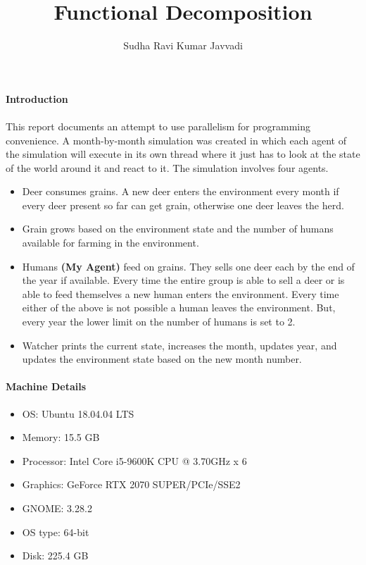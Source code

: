\documentclass[notitlepage]{report}
\title{Functional Decomposition}
\author{Sudha Ravi Kumar Javvadi}
\begin{document}
	\maketitle
	\paragraph{Introduction}
	\paragraph{} This report documents an attempt to use parallelism for programming convenience. A month-by-month simulation was created in which each agent of the simulation will execute in its own thread where it just has to look at the state of the world around it and react to it. The simulation involves four agents.
	\begin{itemize}
		\item{Deer} consumes grains. A new deer enters the environment every month if every deer present so far can get grain, otherwise one deer leaves the herd.
		\item{Grain} grows based on the environment state and the number of humans available for farming in the environment.
		\item{Humans \textbf{(My Agent)}} feed on grains. They sells one deer each by the end of the year if available. Every time the entire group is able to sell a deer or is able to feed themselves a new human enters the environment. Every time either of the above is not possible a human leaves the environment. But, every year the lower limit on the number of humans is set to 2.
		\item{Watcher} prints the current state, increases the month, updates year, and updates the environment state based on the new month number.
	\end{itemize}
	\paragraph{Machine Details}
	\begin{itemize}
		\item{OS}: Ubuntu 18.04.04 LTS
		\item{Memory}: 15.5 GB
		\item{Processor}: Intel Core i5-9600K CPU @ 3.70GHz x 6
		\item{Graphics}: GeForce RTX 2070 SUPER/PCIe/SSE2
		\item{GNOME}: 3.28.2
		\item{OS type}: 64-bit
		\item{Disk}: 225.4 GB
	\end{itemize}
	\clearpage
	
\end{document}
